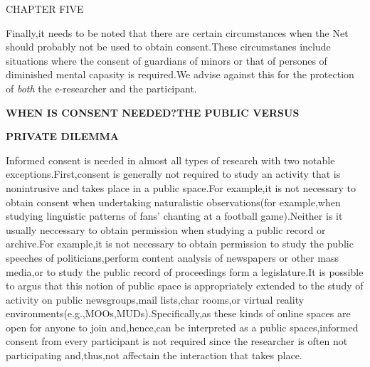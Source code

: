 \documentclass[10pt,a4paper]{book}
\begin{document}
\begin{flushleft}
  \textbf{\!\!\!\!\!\!\!\!\!\!\!\!\!\!\!\!\!\!\!} \quad CHAPTER FIVE
\end{flushleft}

Finally,it needs to be noted that there are certain circumstances when the Net should probably not be used to obtain consent.These circumstanes include situations where the consent of guardians of minors or that of persones of diminished mental capasity is required.We advise against this for the protection of \emph{both} the e-researcher and the participant.

\begin{flushleft}
  \textbf{\!\!\!\!\!\!\!\!\!\!\!\!\!\!\!\!\!\!\!\!WHEN IS CONSENT NEEDED?THE PUBLIC VERSUS}

  \textbf{\!\!\!\!\!\!\!\!\!\!\!\!\!\!\!\!\!\!\!\!PRIVATE DILEMMA}
\end{flushleft}

\!\!\!\!\!\!\!\!\!\!Informed consent is needed in almost all types of research with two notable exceptions.First,consent is generally not required to study an activity that is nonintrusive and takes place in a public space.For example,it is not necessary to obtain consent when undertaking naturalistic observations(for example,when studying linguistic patterns of fans' chanting at a football game).Neither is it usually neccessary to obtain permission when studying a public record or archive.For example,it is not necessary to obtain permission to study the public speeches of politicians,perform content analysis of newspapers or other mass media,or to study the public record of proceedings form a legislature.It is possible to argus that this notion of public space is appropriately extended to the study of activity on public newsgroups,mail lists,char rooms,or virtual reality environments(e.g.,MOOs,MUDs).Specifically,as these kinds of online spaces are open for anyone to join and,hence,can be interpreted as a public spaces,informed consent from every participant is not required since the researcher is often not participating and,thus,not affectain the interaction that takes place.
\end{document}
